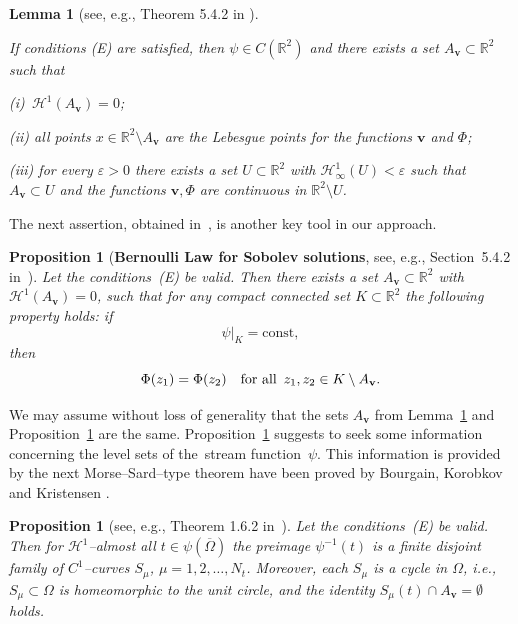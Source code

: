 \documentclass[11pt]{article}
\newtheorem{lemma}[theorem]{Lemma}
\newtheorem{proposition}[theorem]{Proposition}
\numberwithin{equation}{section}
\numberwithin{figure}{section}
\newcommand{\R}{\mathbb{R}}
\def\const{{\mathrm{const}}}
\def\R{{\mathbb R}}
\def\Ha{{\mathscr H}}
\def\ve{{\mathbf v}}
\begin{document}
\begin{lemma}[see, e.g., Theorem 5.4.2 in \cite{korobkov2024steady}]\label{kmpTh2.1}
{\sl If conditions {\rm (E)} are satisfied, then $\psi\in C(\R^2)$
and there exists a set $A_{\ve}\subset \R^2$ such that

 {\rm (i)}\ $ \mathscr{H}^1(A_{\ve})=0$;

{\rm (ii)} all points  $x\in\R^2\setminus A_{\ve}$ are the Lebesgue points for the functions $\ve$ and $\Phi$;

{\rm  (iii) } for every  $\varepsilon >0$ there exists a set
$U\subset \mathbb{R}^2$ with
$\mathscr{H}^1_\infty(U)<\varepsilon$ such that $A_{\ve}\subset
U$ and the functions $\ve, \Phi$ are continuous in $\R^2\setminus
U$.}
\end{lemma}

The next assertion, obtained in~\cite[Theorem~3.2]{kpr}, is
another key tool in our approach.

\medskip

\begin{proposition}[{\bf Bernoulli Law for Sobolev solutions}, see, e.g., Section~5.4.2 in~\cite{korobkov2024steady}]
\label{kmpTh2.2} {\sl Let the conditions~{\rm (E)} be valid. Then
there exists a set $A_\ve\subset \R^2$ with $\Ha^1(A_\ve)=0$, such
that for any compact connected set
$K\subset\R^2$ the following property holds: if
\begin{equation}
\label{2.4} \psi\big|_{K}=\const,
\end{equation}
then
\begin{equation}
\label{2.5'}  \Phi(z_1)=\Phi(z_2) \quad\mbox{for
 all \,}z_1,z_2\in K\setminus A_{\bf v}.
\end{equation}
}
\end{proposition}

We may assume without loss of generality that the
sets $A_\ve$ from Lemma~\ref{kmpTh2.1} and Proposition~\ref{kmpTh2.2}
are the same. Proposition~\ref{kmpTh2.2} suggests to seek some information concerning the level sets of the~stream function~$\psi$. This information is provided by the next Morse--Sard--type theorem have been proved by Bourgain,
Korobkov and Kristensen \cite{BKK13}.

\begin{proposition}[see, e.g., Theorem 1.6.2 in~\cite{korobkov2024steady}]
\label{kmpTh1.1}{\sl  Let the conditions~{\rm (E)} be valid. Then for $\mathscr{H}^1$--almost all $t\in\psi(\overline{\Omega})$ the preimage
$\psi^{-1}(t)$ is a finite disjoint family of $C^1$--curves $S_\mu$,
$\mu=1, 2, \ldots, N_t$. Moreover, each $S_\mu$ is a cycle in
$\Omega$, i.e., $S_\mu\subset\Omega$ is homeomorphic
to the unit circle, and the identity $S_\mu(t)\cap A_\ve=\emptyset$ holds. }
\end{proposition}
\end{document}

